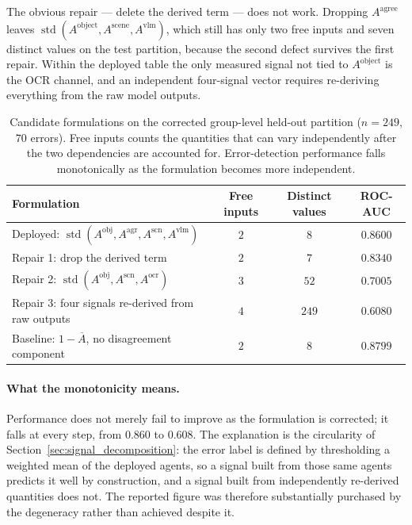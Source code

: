 \documentclass[12pt,a4paper]{report}
\begin{document}
The obvious repair --- delete the derived term --- does not work. Dropping $A^{\text{agree}}$
leaves $\operatorname{std}(A^{\text{object}}, A^{\text{scene}}, A^{\text{vlm}})$, which still has
only two free inputs and seven distinct values on the test partition, because the second defect
survives the first repair. Within the deployed table the only measured signal not tied to
$A^{\text{object}}$ is the OCR channel, and an independent four-signal vector requires
re-deriving everything from the raw model outputs.

\begin{table}[!htbp]
\centering
\caption[Candidate formulations on the corrected group-level held-out partition ($n=249$, $70$ errors)]{Candidate formulations on the corrected group-level held-out partition ($n=249$, $70$ errors). Free inputs counts the quantities that can vary independently after the two dependencies are accounted for. Error-detection performance falls monotonically as the formulation becomes more independent.}
\label{tab:formulation_repair}
\small
\begin{tabular}{@{}p{6.2cm} c c c@{}}
\toprule
\textbf{Formulation} & \textbf{Free inputs} & \textbf{Distinct values} & \textbf{ROC-AUC} \\
\midrule
Deployed: $\operatorname{std}(A^{\text{obj}}, A^{\text{agr}}, A^{\text{scn}}, A^{\text{vlm}})$ & $2$ & $8$ & $\mathbf{0.8600}$ \\
Repair 1: drop the derived term & $2$ & $7$ & $0.8340$ \\
Repair 2: $\operatorname{std}(A^{\text{obj}}, A^{\text{scn}}, A^{\text{ocr}})$ & $3$ & $52$ & $0.7005$ \\
Repair 3: four signals re-derived from raw outputs & $4$ & $249$ & $0.6080$ \\
\addlinespace
Baseline: $1-\overline{A}$, no disagreement component & $2$ & $8$ & $0.8799$ \\
\bottomrule
\end{tabular}
\end{table}

\paragraph{What the monotonicity means.} Performance does not merely fail to improve as the
formulation is corrected; it falls at every step, from $0.860$ to $0.608$. The explanation is the
circularity of Section~\ref{sec:signal_decomposition}: the error label is defined by thresholding a
weighted mean of the deployed agents, so a signal built from those same agents predicts it well by
construction, and a signal built from independently re-derived quantities does not. The reported
figure was therefore substantially purchased by the degeneracy rather than achieved despite it.
\end{document}
